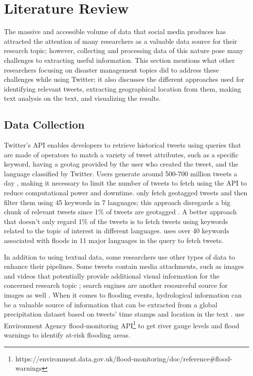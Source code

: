 \chapter{Literature Review}

The massive and accessible volume of data that social media produces has attracted the attention of
many researchers as a valuable data source for their research topic; however, collecting and
processing data of this nature pose many challenges to extracting useful information. This section
mentions what other researchers focusing on disaster management topics did to address these
challenges while using Twitter; it also discusses the different approaches used for identifying
relevant tweets, extracting geographical location from them, making text analysis on the text, and visualizing the results.

\section{Data Collection} 

Twitter's \ac{API} enables developers to retrieve historical tweets using
queries that are made of operators to match a variety of tweet attributes, such as a specific
keyword, having a geotag provided by the user who created the tweet, and the language classified by
Twitter. Users generate around 500-700 million tweets a day \cite{inproceedings}, making it
necessary to limit the number of tweets to fetch using the \ac{API} to reduce computational power and
downtime.  only fetch geotagged tweets and then filter 
them using 45 keywords in 7 languages; this approach disregards a big chunk of relevant tweets
since 1\% of tweets are geotagged \cite{middletonRealTimeCrisisMapping2014}. A better approach that
doesn't only regard 1\% of the tweets is to fetch tweets using keywords related to the topic of
interest in different languages.  uses over 40
keywords associated with floods in 11 major languages in the query to fetch tweets.

In addition to using textual data, some researchers use other types of data to enhance their
pipelines. Some tweets contain media attachments, such as images and videos that potentially provide
additional visual information for the concerned research topic
\cite{alamFloodDetectionTwitter2020}\cite{saidFloodsDetectionTwitter2020}\cite{ningPrototypingSocialMedia2020};
search engines are another resourceful source for images as well
\cite{fengExtractionPluvialFlood2018}. When it comes to flooding events, hydrological information
can be a valuable source of information that can be extracted from a global precipitation dataset
based on tweets' time stamps and location in the text
\cite{debruijnImprovingClassificationFlood2020}.
 use Environment Agency flood-monitoring
\ac{API}\footnote{https://environment.data.gov.uk/flood-monitoring/doc/reference\#flood-warnings} to
get river gauge levels and flood warnings to identify at-risk flooding areas.

